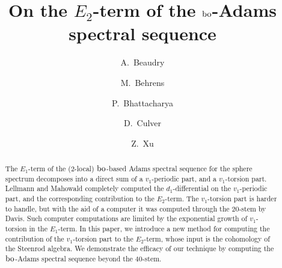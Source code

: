 \documentclass[10pt]{amsart}
\title{On the $E_2$-term of the $\mathrm{bo}$-Adams spectral sequence}
\author{A.~Beaudry}\address{University of Colorado Boulder}\email{agnes.beaudry@colorado.edu}
\author{M.~Behrens}\address{University of Notre Dame}\email{mbehren1@nd.edu}
\author{P.~Bhattacharya}\address{University of Virginia}\email{pb9wh@virginia.edu}
\author{D.~Culver}\address{ University of Illinois Urbana-Champaign}\email{dculver@illinois.edu}
\author{Z.~Xu}\address{Massachusetts Institute of Technology}\email{xuzhouli@mit.edu}
\begin{document}
\begin{abstract}
The $E_1$-term of the ($2$-local) $\mathrm{bo}$-based Adams spectral sequence for the sphere spectrum decomposes into a direct sum of a $v_1$-periodic part, and a $v_1$-torsion part.
Lellmann and Mahowald completely computed the $d_1$-differential on the $v_1$-periodic part, and  the corresponding contribution to the $E_2$-term.  The $v_1$-torsion part is harder to handle, but with the aid of a computer it was computed through the $20$-stem by Davis.  Such computer computations are limited by the exponential growth of $v_1$-torsion in the $E_1$-term.  In this paper, we introduce a new method for computing the contribution of the $v_1$-torsion part to the $E_2$-term, whose input is the cohomology of the Steenrod algebra.  We demonstrate the efficacy of our technique by computing the $\mathrm{bo}$-Adams spectral sequence beyond the $40$-stem.
\end{abstract}

\maketitle	

\tableofcontents






















\end{document}
